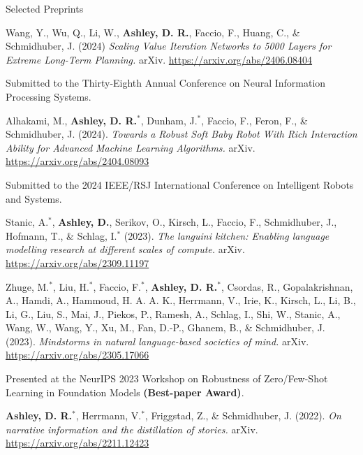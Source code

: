 \documentclass{cv}
\begin{document}
\begin{rSection}{Selected Preprints}

\begin{rPublications}
    \item
        Wang, Y., Wu, Q., Li, W., \textbf{Ashley, D. R.}, Faccio, F., Huang, C., \& Schmidhuber, J.
        (2024)
        \textit{Scaling Value Iteration Networks to 5000 Layers for Extreme Long-Term Planning.}
        arXiv.
        \url{https://arxiv.org/abs/2406.08404}

        \vspace{-0.1em} Submitted to the Thirty-Eighth Annual Conference on Neural Information Processing Systems.
    \item
        Alhakami, M., \textbf{Ashley, D. R.}$^*$, Dunham, J.$^*$, Faccio, F., Feron, F., \& Schmidhuber, J.
        (2024).
        \textit{Towards a Robust Soft Baby Robot With Rich Interaction Ability for Advanced Machine Learning Algorithms.}
        arXiv.
        \url{https://arxiv.org/abs/2404.08093}

        \vspace{-0.1em} Submitted to the 2024 {IEEE/RSJ} International Conference on Intelligent Robots and Systems.
    \item
        Stanic, A.$^*$, \textbf{Ashley, D.}, Serikov, O., Kirsch, L., Faccio, F., Schmidhuber, J., Hofmann, T., \& Schlag, I.$^*$
        (2023).
        \textit{The languini kitchen: Enabling language modelling research at different scales of compute.}
        arXiv.
        \url{https://arxiv.org/abs/2309.11197}
    \item
        Zhuge, M.$^*$, Liu, H.$^*$, Faccio, F.$^*$, \textbf{Ashley, D. R.}$^*$, Csordas, R., Gopalakrishnan, A., Hamdi, A., Hammoud, H. A. A. K., Herrmann, V., Irie, K., Kirsch, L., Li, B., Li, G., Liu, S., Mai, J., Piekos, P., Ramesh, A., Schlag, I., Shi, W., Stanic, A., Wang, W., Wang, Y., Xu, M., Fan, D.-P., Ghanem, B., \& Schmidhuber, J.
        (2023).
        \textit{Mindstorms in natural language-based societies of mind.}
        arXiv.
        \url{https://arxiv.org/abs/2305.17066}

        \vspace{-0.1em} Presented at the NeurIPS 2023 Workshop on Robustness of Zero/Few-Shot Learning in Foundation Models \textbf{(Best-paper Award)}.
    \item
        \textbf{Ashley, D. R.}$^*$, Herrmann, V.$^*$, Friggstad, Z., \& Schmidhuber, J.
        (2022).
        \textit{On narrative information and the distillation of stories.}
        arXiv.
        \url{https://arxiv.org/abs/2211.12423}


\end{rPublications}
\end{rSection}
\end{document}
